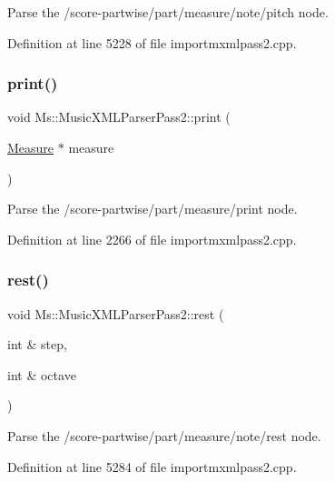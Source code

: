 Parse the /score-\/partwise/part/measure/note/pitch node. 

Definition at line 5228 of file importmxmlpass2.\+cpp.

\mbox{\label{class_ms_1_1_music_x_m_l_parser_pass2_a2bbb76c80c200f8c49119cbcdaf48f7e}} 
\subsubsection{\texorpdfstring{print()}{print()}}
{\footnotesize\ttfamily void Ms\+::\+Music\+X\+M\+L\+Parser\+Pass2\+::print (\begin{DoxyParamCaption}\item[{\hyperlink{class_ms_1_1_measure}{Measure} $\ast$}]{measure }\end{DoxyParamCaption})}

Parse the /score-\/partwise/part/measure/print node. 

Definition at line 2266 of file importmxmlpass2.\+cpp.

\mbox{\label{class_ms_1_1_music_x_m_l_parser_pass2_a1a33ece7284b3787aadb25575b1d6f45}} 
\subsubsection{\texorpdfstring{rest()}{rest()}}
{\footnotesize\ttfamily void Ms\+::\+Music\+X\+M\+L\+Parser\+Pass2\+::rest (\begin{DoxyParamCaption}\item[{int \&}]{step,  }\item[{int \&}]{octave }\end{DoxyParamCaption})}

Parse the /score-\/partwise/part/measure/note/rest node. 

Definition at line 5284 of file importmxmlpass2.\+cpp.

\mbox{\label{class_ms_1_1_music_x_m_l_parser_pass2_afab0f4e00bcb58b3e0f480663f5a394c}} 
